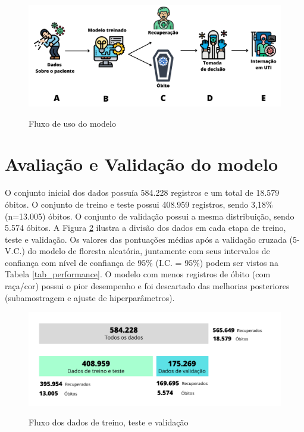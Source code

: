 
\begin{figure}[H]
\caption{Fluxo de uso do modelo}
\centering %
\includegraphics[width=\textwidth]{figuras/fluxo_geral.png}
\label{figura_geral}
\end{figure}

\section{Avaliação e Validação do modelo}

O conjunto inicial dos dados possuía 584.228 registros e um total de 18.579 óbitos. O conjunto de treino e teste possui 408.959 registros, sendo 3,18\% (n=13.005) óbitos. O conjunto de validação possui a mesma distribuição, sendo 5.574 óbitos. A Figura \ref{figura_train_test} ilustra a divisão dos dados em cada etapa de treino, teste e validação. Os valores das pontuações médias após a validação cruzada (5-V.C.) do modelo de floresta aleatória, juntamente com seus intervalos de confiança com nível de confiança de 95\% (I.C. = 95\%) podem ser vistos na Tabela \ref{tab_performance}. O modelo com menos registros de óbito (com raça/cor) possui o pior desempenho e foi descartado das melhorias posteriores (subamostragem e ajuste de hiperparâmetros).

\begin{figure}[H]
\caption{Fluxo dos dados de treino, teste e validação}
\centering %
\includegraphics[width=\textwidth]{figuras/fluxo_treino_teste.png}
\label{figura_train_test}
\end{figure}

